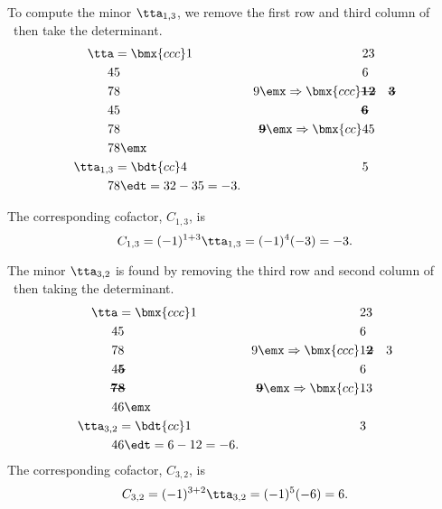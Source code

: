 \medskip

{To compute the minor $\tta_{1,3}$, we remove the first row and third column of \tta\ then take the determinant. 
\begin{align*}
\tta &= \bmx{ccc}1&2&3\\4&5&6\\7&8&9\emx\Rightarrow\bmx{ccc}\textbf{\sout{1}}&\textbf{\sout{2}}&\textbf{\sout{3}}\\4&5&\textbf{\sout{6}}\\7&8&\textbf{\sout{9}}\emx\Rightarrow\bmx{cc}4&5\\7&8\emx \\
\tta_{1,3} &= \bdt{cc}4&5\\7&8\edt = 32-35 = -3.
\end{align*}
 
The corresponding cofactor, $C_{1,3}$, is
\[
C_{1,3} = (-1)^{1+3}\tta_{1,3} = (-1)^4(-3) = -3.
\]

The minor $\tta_{3,2}$ is found by removing the third row and second column of \tta\ then taking the determinant.
\begin{align*}
\tta &= \bmx{ccc}1&2&3\\4&5&6\\7&8&9\emx\Rightarrow\bmx{ccc}1&\textbf{\sout{2}}&3\\4&\textbf{\sout{5}}&6\\ \textbf{\sout{7}}&\textbf{\sout{8}}&\textbf{\sout{9}}\emx\Rightarrow \bmx{cc}1&3\\4&6\emx\\
\tta_{3,2} &= \bdt{cc}1&3\\4&6\edt = 6-12 = -6.
\end{align*} 
The corresponding cofactor, $C_{3,2}$, is
\[
C_{3,2} = (-1)^{3+2}\tta_{3,2} = (-1)^5(-6) = 6.
\]


}
